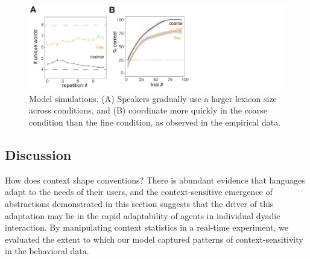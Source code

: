 

\begin{figure}[t]
\begin{center}
\includegraphics[scale=0.6]{./figures/sec2-modelFig.pdf}
\vspace{-1ex}
{\caption{{Model simulations. (A) Speakers gradually use a larger lexicon size across conditions, and (B) coordinate more quickly in the coarse condition than the fine condition, as observed in the empirical data.}  \label{fig:sec2model}}}
\end{center}
\vspace{-3ex}
\end{figure}

\subsection{Discussion}

How does context shape conventions? 
There is abundant evidence that languages adapt to the needs of their users, and the context-sensitive emergence of abstractions demonstrated in this section suggests that the driver of this adaptation may lie in the rapid adaptability of agents in individual dyadic interaction. 
By manipulating context statistics in a real-time experiment, we evaluated the extent to which our model captured patterns of context-sensitivity in the behavioral data.

